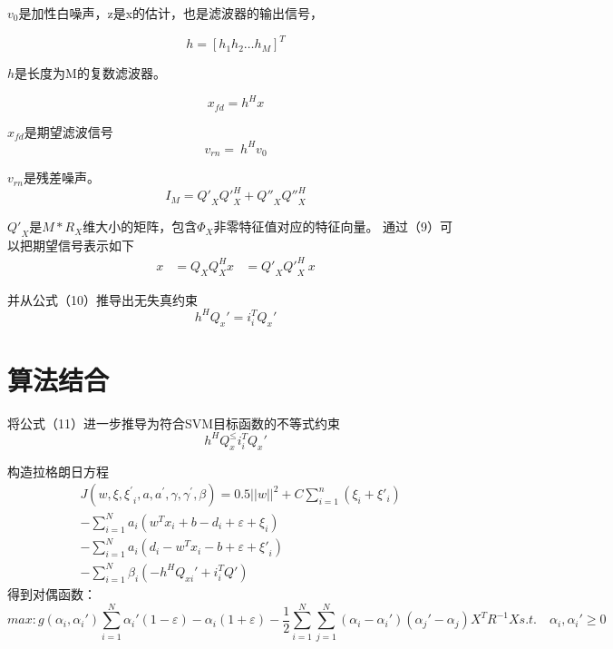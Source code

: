 $v_0$是加性白噪声，z是x的估计，也是滤波器的输出信号，

\begin{equation}
h=\left[h_1h_2\ldots h_M\right]^T
\end{equation}

$h$是长度为M的复数滤波器。

\begin{equation}
x_{fd}= h^Hx
\end{equation}

$x_{fd}$是期望滤波信号
\begin{equation}
v_{rn}=\ h^Hv_0
\end{equation}

$v_{rn}$是残差噪声。
\begin{equation}
I_M={Q'}_X{Q'}_X^H+{Q''}_X{Q''}_X^H
\end{equation}

${Q'}_X$是$M*R_X$维大小的矩阵，包含$\Phi_X$非零特征值对应的特征向量。
通过（9）可以把期望信号表示如下
\begin{equation}
\begin{aligned}
x&=Q_XQ_X^Hx
&={Q'}_X{Q'}_X^H\ x
\end{aligned}
\end{equation}

并从公式（10）推导出无失真约束
\begin{equation}
h^HQ_x'=i_i^TQ_x'
\end{equation}

\section{算法结合}
将公式（11）进一步推导为符合SVM目标函数的不等式约束
\begin{equation}
h^HQ_x^\le i_i^TQ_x'
\end{equation}

构造拉格朗日方程
\begin{equation}
\begin{aligned}
&J\left(w,\xi,{\xi^\prime}_i,a,a^\prime,\gamma,\gamma^\prime,\beta\right)=0.5||w||^2+C\sum\limits_{i=1}^{n}(\xi_i +\xi'_i)\\
&-\sum_{i=1}^{N}{a_i\left(w^Tx_i+b-d_i+\varepsilon+\xi_i\right)}\\
&-\sum_{i=1}^{N}{a_i\left(d_i-w^Tx_i-b+\varepsilon+{\xi'}_i\right)}\\
&-\sum_{i=1}^{N}{\beta_i\left(-h^HQ_{xi}'+i_i^TQ'\right)}
\end{aligned}
\end{equation}
得到对偶函数：
\begin{equation}
max: g(\alpha_i, \alpha _i{}')\sum_{i=1}^{N}\alpha _i{}'(1-\varepsilon )-\alpha_i(1+\varepsilon )-\frac{1}{2}\sum_{i=1}^{N}\sum_{j=1}^{N}(\alpha_i-\alpha _i{}')(\alpha _j{}'-\alpha_j)X^{T}R^{-1}X
s.t.\quad \alpha_i, \alpha _i{}'\geq 0
\end{equation}

